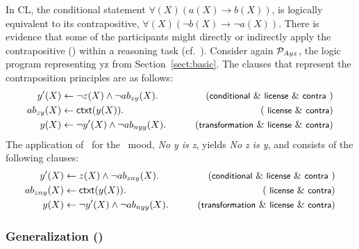 \documentclass[12pt]{article}
\begin{document}
In CL, the conditional statement $\forall (X) (a(X) \rightarrow b(X))$, is logically
equivalent to its contrapositive, $\forall (X) (\neg b(X) \rightarrow \neg a(X))$.
There is
evidence that some of the participants might directly or indirectly 
apply the contrapositive (\contraposition) within a reasoning task (cf.~\cite{rips:1994,mentallogic:1994}).
Consider again ${\cal P}_{Ayz}$, the logic program representing \MA yz
from Section~\ref{sect:basic}. The clauses that represent the contraposition principles are as follows:
\begin{align}
y'(X) & \leftarrow  \neg z(X) \wedge \neg \Ab_{zy}(X). & \tag{\conditionals\ \&\ \licenses\ \&\ \contraposition\ } \\
\Ab_{zy}(X) & \leftarrow \cxt(y(X)). & \tag{ \licenses\ \&\ \contraposition}\\
y(X) & \leftarrow  \neg y'(X) \wedge \neg \Ab_{nyy}(X). & \tag{\transformation\ \&\ \licenses\ \&\ \contraposition} 
\end{align}
The application of \contraposition\ for the \ME\ mood,
\textit{No y is z}, yields \textit{No z is y}, and consists of the following clauses:
\begin{align}
y'(X) & \leftarrow z(X) \wedge \neg \Ab_{zny}(X). & \tag{\conditionals\ \&\ \licenses\ \&\ \contraposition\ } \\
\Ab_{zny}(X) & \leftarrow \cxt(y(X)). &\tag{ \licenses\ \&\ \contraposition}\\
y(X) & \leftarrow \neg y'(X) \wedge \neg \Ab_{nyy}(X). & \tag{\transformation\ \&\ \licenses\ \&\ \contraposition} 
\end{align}




\subsubsection{Generalization (\negFailure)}  %
\end{document}
